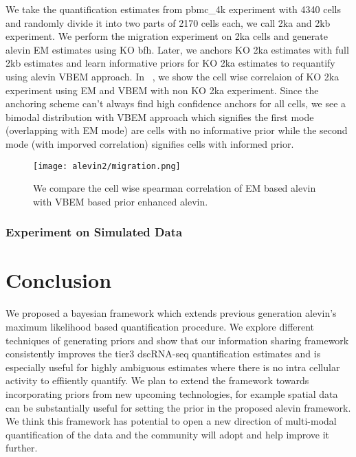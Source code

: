 We take the quantification estimates from pbmc\_4k experiment with 4340 cells and randomly divide it into
two parts of 2170 cells each, we call 2ka and 2kb experiment. We perform the migration experiment on
2ka cells and generate alevin EM estimates using KO bfh. Later, we anchors KO 2ka estimates 
with full 2kb estimates and learn informative priors for KO 2ka estimates to requantify using alevin VBEM
approach. In ~, we show the cell wise correlaion of KO 2ka experiment using EM and VBEM
with non KO 2ka experiment. Since the anchoring scheme can't always find high confidence anchors for all 
cells, we see a bimodal distribution with VBEM approach which signifies the first mode (overlapping 
with EM mode) are cells with no informative prior while the second mode (with imporved correlation)
signifies cells with informed prior.

  \begin{figure}[!htb]
      \centering
    \texttt{[image: alevin2/migration.png]}
    \caption{ We compare the cell wise spearman correlation of EM based alevin with VBEM based
	prior enhanced alevin.}
    \label{fig:alv2_t3}
  \end{figure}

\subsubsection{Experiment on Simulated Data}

\section{Conclusion}
We proposed a bayesian framework which extends previous generation alevin's maximum likelihood based 
quantification procedure. We explore different techniques of generating priors and show that our 
information sharing framework consistently improves the tier3 dscRNA-seq quantification estimates and 
is especially useful for highly ambiguous estimates where there is no intra cellular activity to 
effiiently quantify. We plan to extend the framework towards incorporating priors from new upcoming 
technologies, for example spatial data can be substantially useful for setting the prior in the proposed 
alevin framework.  We think this framework has potential to open a new direction of multi-modal 
quantification of the data and the community will adopt and help improve it further.

